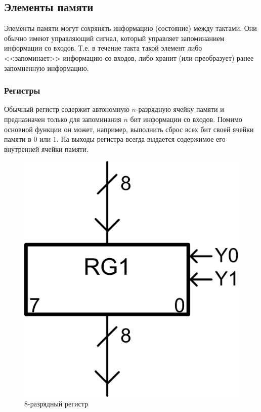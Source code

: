 \subsection{Элементы памяти}

Элементы памяти могут сохрянять информацию (состояние) между тактами. Они обычно имеют управляющий сигнал, который управляет запоминанием информации со входов. Т.е. в течение такта такой элемент либо <<запоминает>> информацию со входов, либо хранит (или преобразует) ранее запомненную информацию.

\subsubsection{Регистры}
\label{sss::ch::practice::regiter}

Обычный регистр содержит автономную $n$-разрядную ячейку памяти и предназначен только для запоминания $n$ бит информации со входов. Помимо основной функции он может, например, выполнить сброс всех бит своей ячейки памяти в $0$ или $1$. На выходы регистра всегда выдается содержимое его внутренней ячейки памяти.

\begin{figure}[!ht]
    \centering
    \includegraphics{fig/register}
    \caption{8-разрядный регистр}
    \label{fig::ch::practice::register}
\end{figure}

